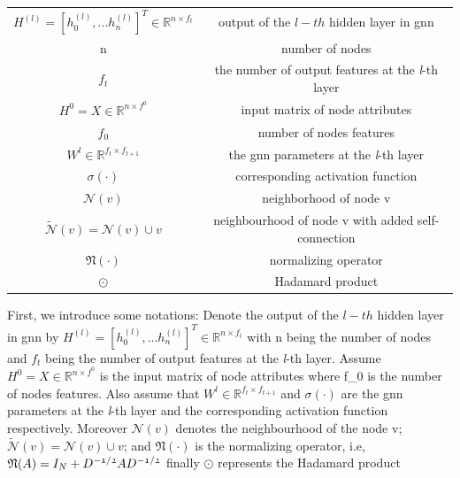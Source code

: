 \begin{center}
    \begin{tabular}{|c|c|}
        \hline
        $H^{(l)}= [h_{0}^{(l)},...h_{n}^{(l)}]^T \in \mathbb{R}^{n \times f_{t}}$ & output of the $l-th$ hidden layer in \ac{gnn}            \\
        n                                                                         & number of nodes                                          \\
        $f_{t}$                                                                   & the number of output features at the \textit{l}-th layer \\
        $H^{0}= X \in \mathbb{R}^{n \times f^{0}}$                                & input matrix of node attributes                          \\
        $f_{0}$                                                                   & number of nodes features                                 \\
        $W^{l} \in \mathbb{R}^{f_{t} \times f_{t+1}}$                             & the \ac{gnn} parameters at the \textit{l}-th layer       \\
        $\sigma (\cdot)$                                                          & corresponding activation function                        \\
        $\mathcal{N}(v)$                                                          & neighborhood of node v                                   \\
        $\tilde{\mathcal{N}}(v) = \mathcal{N}(v) \cup {v}$                        & neighbourhood of node v with added self-connection       \\
        $\mathfrak{N}(\cdot)$                                                     & normalizing operator                                     \\
        $\odot$                                                                   & Hadamard product                                         \\
        \hline
    \end{tabular}
\end{center}

First, we introduce some notations:
Denote the output of the $l-th$ hidden layer in \ac{gnn} by $H^{(l)}= [h_{0}^{(l)},...h_{n}^{(l)}]^T \in \mathbb{R}^{n \times f_{t}}$
with n being the number of nodes and $f_{t}$ being the number of output features at the \textit{l}-th
layer. Assume $H^{0}= X \in \mathbb{R}^{n \times f^{0}}$ is the input matrix of node attributes where
f_{0} is the number of nodes features. Also assume that $W^{l} \in \mathbb{R}^{f_{t} \times f_{t+1}}$
and $\sigma (\cdot)$ are the \ac{gnn} parameters at the \textit{l}-th layer and the corresponding
activation function respectively. Moreover $\mathcal{N}(v)$ denotes the neighbourhood of the
node v; $\tilde{\mathcal{N}}(v) = \mathcal{N}(v) \cup {v}$; and $\mathfrak{N}(\cdot)$ is the
normalizing operator, i.e, $\mathfrak{N}(A) = I_{N} + D^{-\frak{1/2}}A D^{-\frak{1/2}}$
finally $\odot$ represents the Hadamard product\\


